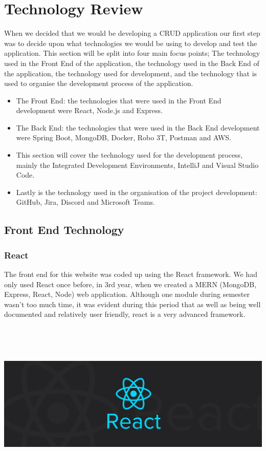 \chapter{Technology Review}
 When we decided that we would be developing a CRUD application our first step was to decide upon what technologies we would be using to develop and test the application. This section will be split into four main focus points; The technology used in the Front End of the application, the technology used in the Back End of the application, the technology used for development, and the technology that is used to organise the development process of the application.
\begin{itemize}
\item The Front End: the technologies that were used in the Front End development were React, Node.js and Express.
\item The Back End: the technologies that were used in the Back End development were Spring Boot, MongoDB, Docker, Robo 3T, Postman and AWS.
\item This section will cover the technology used for the development process, mainly the Integrated Development Environments, IntelliJ and Visual Studio Code.
\item Lastly is the technology used in the organisation of the project development: GitHub, Jira, Discord and Microsoft Teams.
\end{itemize}

\section{Front End Technology}
\subsection{React}
The front end for this website was coded up using the React framework. We had only used React once before, in 3rd year, when we created a MERN (MongoDB, Express, React, Node) web application. Although one module during semester wasn't too much time, it was evident during this period that as well as being well documented and relatively user friendly, react is a very advanced framework.
\begin{center}
    \includegraphics[width = 16cm, height = 8cm]{img/reactImage.jpeg}
\end{center}
    
